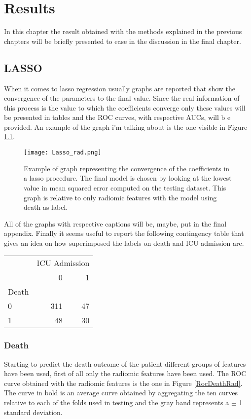 \chapter{Results}
In this chapter the result obtained with the methods explained in the previous chapters will be briefly presented to ease in the discussion in the final chapter. 

\section{LASSO}
When it comes to lasso regression usually graphs are reported that show the convergence of the parameters to the final value. Since the real information of this process is the value to which the coefficients converge only these values will be presented in tables and the ROC curves, with respective AUCs, will b e provided. An example of the graph i'm talking about is the one visible in Figure \ref{LassoParam}.


\begin{figure}[htbp]
  		\texttt{[image: Lasso\_rad.png]}
        \caption{Example of graph representing the convergence of the coefficients in a lasso procedure. The final model is chosen by looking at the lowest value in mean squared error computed on the testing dataset. This graph is relative to only radiomic features with the model using death as label.\label{LassoParam}}
\end{figure}

All of the graphs with respective captions will be, maybe, put in the final appendix.
Finally it seems useful to report the following contingency table that gives an idea on how superimposed the labels on death and ICU admission are.

\begin{tabular}{l|rr}
\toprule
{} & \multicolumn{2}{l}{ICU Admission} \\
 &       0 &   1 \\
Death &         &     \\
\midrule
0     &     311 &  47 \\
1     &      48 &  30 \\
\bottomrule
\end{tabular}

\subsection{Death}
Starting to predict the death outcome of the patient different groups of features have been used, first of all only the radiomic features have been used. The ROC curve obtained with the radiomic features is the one in Figure \ref{RocDeathRad}. The curve in bold is an average curve obtained by aggregating the ten curves relative to each of the folds used in testing and the gray band represents a $\pm$ 1 standard deviation.

